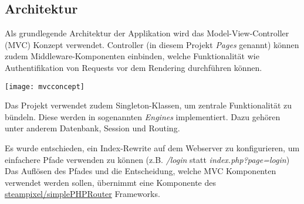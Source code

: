\subsection{Architektur}
Als grundlegende Architektur der Applikation wird das Model-View-Controller (MVC) Konzept verwendet. Controller (in diesem Projekt \emph{Pages} genannt) können zudem Middleware-Komponenten einbinden, welche Funktionalität wie Authentifikation von Requests vor dem Rendering durchführen können.

\vspace{2mm}
\texttt{[image: mvcconcept]}
\vspace{2mm}

Das Projekt verwendet zudem Singleton-Klassen, um zentrale Funktionalität zu bündeln. Diese werden in sogenannten \emph{Engines} implementiert. Dazu gehören unter anderem Datenbank, Session und Routing.

Es wurde entschieden, ein Index-Rewrite auf dem Webserver zu konfigurieren, um einfachere Pfade verwenden zu können (z.B. \textit{/login} statt \textit{index.php?page=login}) Das Auflösen des Pfades und die Entscheidung, welche MVC Komponenten verwendet werden sollen, übernimmt eine Komponente des \href{https://github.com/steampixel/simplePHPRouter}{steampixel/simplePHPRouter} Frameworks.
